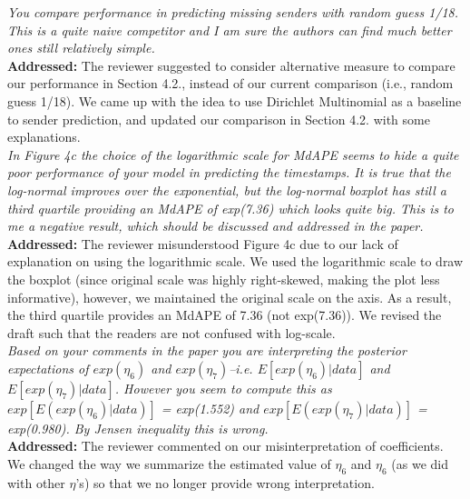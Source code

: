\documentclass[12pt]{article}
\newcommand{\grey}[1]{{\color{mygrey}#1}}
\theoremstyle{definition}
\begin{document}
 \grey{\emph{You compare performance in predicting missing senders with random guess 1/18. This is a quite naive competitor and I am sure the authors can find much better ones still relatively simple.}}\\

\noindent \textcolor{MyGreen}{\textbf{Addressed:}} The reviewer suggested to consider alternative measure to compare our performance in Section 4.2., instead of our current comparison (i.e., random guess 1/18). We came up with the idea to use Dirichlet Multinomial as a baseline to sender prediction, and updated our comparison in Section 4.2. with some explanations. \\

 \grey{\emph{In Figure 4c the choice of the logarithmic scale for MdAPE seems to hide a quite poor performance of your model in predicting the timestamps. It is true that the log-normal improves over the exponential, but the log-normal boxplot has still a third quartile providing an MdAPE of exp(7.36) which looks quite big. This is to me a negative result, which should be discussed and addressed in the paper.}}\\

\noindent \textcolor{MyGreen}{\textbf{Addressed:}} The reviewer misunderstood Figure 4c due to our lack of explanation on using the logarithmic scale. We used the logarithmic scale to draw the boxplot (since original scale was highly right-skewed, making the plot less informative), however, we maintained the original scale on the axis. As a result, the third quartile provides an MdAPE of 7.36 (not exp(7.36)). We revised the draft such that the readers are not confused with log-scale. \\



 \grey{\emph{Based on your comments in the paper you are interpreting the posterior expectations of $exp(\eta_6)$ and $exp(\eta_7)$--i.e. $E[exp(\eta_6)| data]$ and $E[exp(\eta_7) |data]$. However you seem to compute this as $exp[E(exp(\eta_6) | data)]$ = exp(1.552) and $exp[E(exp(\eta_7) |data)]$ = exp(0.980). By Jensen inequality this is wrong.}}\\

\noindent \textcolor{MyGreen}{\textbf{Addressed:}} The reviewer commented on our misinterpretation of coefficients. We changed the way we summarize the estimated value of $\eta_6$ and $\eta_6$ (as we did with other $\eta$'s) so that we no longer provide wrong interpretation.\\
\end{document}
